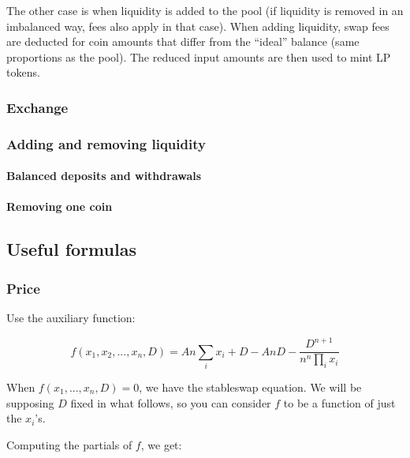 \documentclass[
]{article}
\begin{document}
The other case is when liquidity is added to the pool (if liquidity is
removed in an imbalanced way, fees also apply in that case). When adding
liquidity, swap fees are deducted for coin amounts that differ from the
``ideal'' balance (same proportions as the pool). The reduced input
amounts are then used to mint LP tokens.

\hypertarget{exchange}{%
\subsubsection{Exchange}\label{exchange}}

\hypertarget{adding-and-removing-liquidity}{%
\subsubsection{Adding and removing
liquidity}\label{adding-and-removing-liquidity}}

\hypertarget{balanced-deposits-and-withdrawals}{%
\paragraph{Balanced deposits and
withdrawals}\label{balanced-deposits-and-withdrawals}}

\hypertarget{removing-one-coin}{%
\paragraph{Removing one coin}\label{removing-one-coin}}

\hypertarget{useful-formulas}{%
\subsection{Useful formulas}\label{useful-formulas}}

\hypertarget{price}{%
\subsubsection{Price}\label{price}}

Use the auxiliary function:

\[ f(x_1, x_2, ..., x_n, D) = A n \sum_i x_i + D - A n D - \frac{D^{n+1}}{n^n \prod_i x_i} \]

When \(f(x_1, ..., x_n, D) = 0\), we have the stableswap equation. We
will be supposing \(D\) fixed in what follows, so you can consider \(f\)
to be a function of just the \(x_i\)'s.

Computing the partials of \(f\), we get:
\end{document}
